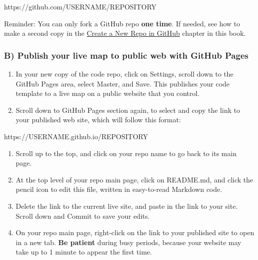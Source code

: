 \documentclass[
  english,
]{book}
\newenvironment{Shaded}{\begin{snugshade}}{\end{snugshade}}
\newcommand{\NormalTok}[1]{#1}
\begin{document}
\begin{Shaded}
\begin{Highlighting}[]
\NormalTok{https://github.com/USERNAME/REPOSITORY}
\end{Highlighting}
\end{Shaded}

Reminder: You can only fork a GitHub repo \textbf{one time}. If needed, see how to make a second copy in the \href{create-repo}{Create a New Repo in GitHub} chapter in this book.

\hypertarget{b-publish-your-live-map-to-public-web-with-github-pages}{%
\subsubsection*{B) Publish your live map to public web with GitHub Pages}\label{b-publish-your-live-map-to-public-web-with-github-pages}}

\begin{enumerate}
\def\labelenumi{\arabic{enumi})}
\setcounter{enumi}{3}
\item
  In your new copy of the code repo, click on Settings, scroll down to the GitHub Pages area, select Master, and Save. This publishes your code template to a live map on a public website that you control.
\item
  Scroll down to GitHub Pages section again, to select and copy the link to your published web site, which will follow this format:
\end{enumerate}

\begin{Shaded}
\begin{Highlighting}[]
\NormalTok{https://USERNAME.github.io/REPOSITORY}
\end{Highlighting}
\end{Shaded}

\begin{enumerate}
\def\labelenumi{\arabic{enumi})}
\setcounter{enumi}{5}
\item
  Scroll up to the top, and click on your repo name to go back to its main page.
\item
  At the top level of your repo main page, click on README.md, and click the pencil icon to edit this file, written in easy-to-read Markdown code.
\item
  Delete the link to the current live site, and paste in the link to your site. Scroll down and Commit to save your edits.
\item
  On your repo main page, right-click on the link to your published site to open in a new tab. \textbf{Be patient} during busy periods, because your website may take up to 1 minute to appear the first time.
\end{enumerate}
\end{document}
